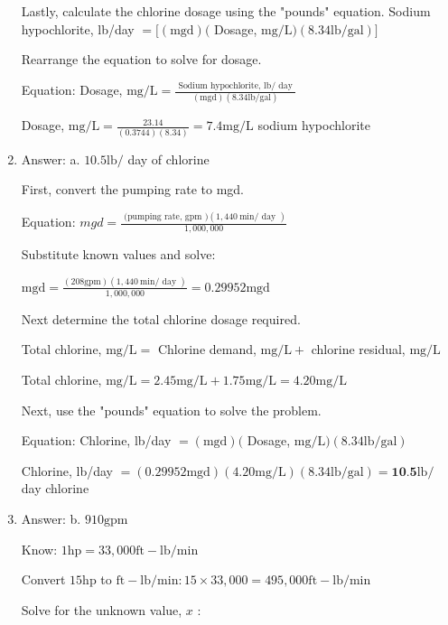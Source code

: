 \documentclass[10pt]{article}
\begin{document}
\begin{enumerate}
Lastly, calculate the chlorine dosage using the "pounds" equation. Sodium hypochlorite, lb/day $=[(\mathrm{mgd})($ Dosage, $\mathrm{mg} / \mathrm{L})(8.34 \mathrm{lb} / \mathrm{gal})]$

Rearrange the equation to solve for dosage.

Equation: Dosage, $\mathrm{mg} / \mathrm{L}=\frac{\text { Sodium hypochlorite, } \mathrm{lb} / \text { day }}{(\mathrm{mgd})(8.34 \mathrm{lb} / \mathrm{gal})}$

Dosage, $\mathrm{mg} / \mathrm{L}=\frac{23.14}{(0.3744)(8.34)}=7.4 \mathrm{mg} / \mathrm{L}$ sodium hypochlorite


  \item Answer: a. $10.5 \mathrm{lb} /$ day of chlorine

First, convert the pumping rate to mgd.

Equation: $m g d=\frac{\text { (pumping rate, gpm })(1,440 \mathrm{~min} / \text { day })}{1,000,000}$

Substitute known values and solve:

$\mathrm{mgd}=\frac{(208 \mathrm{gpm})(1,440 \mathrm{~min} / \text { day })}{1,000,000}=0.29952 \mathrm{mgd}$

Next determine the total chlorine dosage required.

Total chlorine, $\mathrm{mg} / \mathrm{L}=$ Chlorine demand, $\mathrm{mg} / \mathrm{L}+$ chlorine residual, $\mathrm{mg} / \mathrm{L}$

Total chlorine, $\mathrm{mg} / \mathrm{L}=2.45 \mathrm{mg} / \mathrm{L}+1.75 \mathrm{mg} / \mathrm{L}=4.20 \mathrm{mg} / \mathrm{L}$

Next, use the "pounds" equation to solve the problem.

Equation: Chlorine, lb/day $=(\mathrm{mgd})($ Dosage, $\mathrm{mg} / \mathrm{L})(8.34 \mathrm{lb} / \mathrm{gal})$

Chlorine, lb/day $=(0.29952 \mathrm{mgd})(4.20 \mathrm{mg} / \mathrm{L})(8.34 \mathrm{lb} / \mathrm{gal})=\mathbf{1 0 . 5} \mathrm{lb} /$ day chlorine

  \item Answer: b. $910 \mathrm{gpm}$


Know: $1 \mathrm{hp}=33,000 \mathrm{ft}-\mathrm{lb} / \mathrm{min}$

Convert $15 \mathrm{hp}$ to $\mathrm{ft}-\mathrm{lb} / \mathrm{min}: 15 \times 33,000=495,000 \mathrm{ft}-\mathrm{lb} / \mathrm{min}$

Solve for the unknown value, $x$ :


\end{enumerate}
\end{document}

